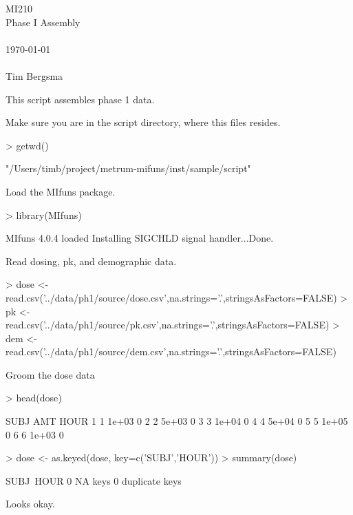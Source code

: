 
\usepackage{Sweave}

 

\vspace*{2cm}
\begin{center}
{\Huge MI210}\\
\vspace{1.5cm}
{\Large Phase I Assembly}\\
~\\
\today\\
~\\
Tim Bergsma\\
\end{center}
\newpage

This script assembles phase 1 data.

Make sure you are in the script directory, where this files resides.
\begin{Schunk}
\begin{Sinput}
> getwd()
\end{Sinput}
\begin{Soutput}
[1] "/Users/timb/project/metrum-mifuns/inst/sample/script"
\end{Soutput}
\end{Schunk}
Load the MIfuns package.
\begin{Schunk}
\begin{Sinput}
> library(MIfuns)
\end{Sinput}
\begin{Soutput}
MIfuns 4.0.4 loaded
Installing SIGCHLD signal handler...Done.
\end{Soutput}
\end{Schunk}
Read dosing, pk, and demographic data.
\begin{Schunk}
\begin{Sinput}
> dose <- read.csv('../data/ph1/source/dose.csv',na.strings='.',stringsAsFactors=FALSE)
> pk   <- read.csv('../data/ph1/source/pk.csv',na.strings='.',stringsAsFactors=FALSE)
> dem  <- read.csv('../data/ph1/source/dem.csv',na.strings='.',stringsAsFactors=FALSE)
\end{Sinput}
\end{Schunk}
Groom the dose data
\begin{Schunk}
\begin{Sinput}
> head(dose)
\end{Sinput}
\begin{Soutput}
  SUBJ   AMT HOUR
1    1 1e+03    0
2    2 5e+03    0
3    3 1e+04    0
4    4 5e+04    0
5    5 1e+05    0
6    6 1e+03    0
\end{Soutput}
\begin{Sinput}
> dose <- as.keyed(dose, key=c('SUBJ','HOUR'))
> summary(dose)
\end{Sinput}
\begin{Soutput}
SUBJ~HOUR
0 NA keys
0 duplicate keys
\end{Soutput}
\end{Schunk}
Looks okay.

